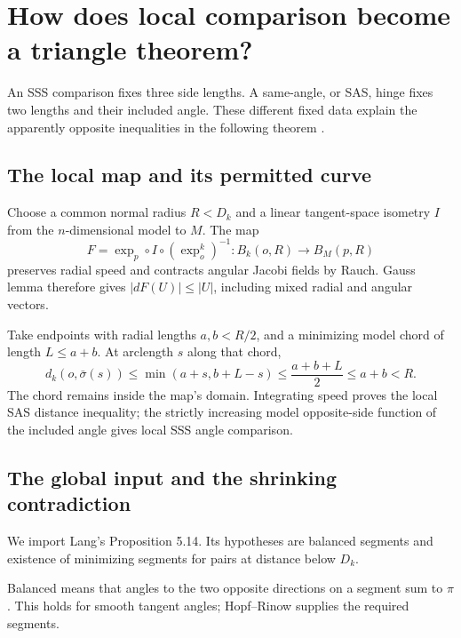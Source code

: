 \documentclass[12pt,reqno]{amsart}
\begin{document}
\section{How does local comparison become a triangle theorem?}
\label{sec:toponogov}

An SSS comparison fixes three side lengths. A same-angle, or SAS, hinge fixes two lengths and their included angle. These different fixed data explain the apparently opposite inequalities in the following theorem \cite{S-Lang-2026,S-Toponogov-1959}.

\begin{samepage}
\begin{theorem}[Toponogov]
\label{thm:toponogov}

\end{theorem}
\end{samepage}

\subsection*{The local map and its permitted curve}
Choose a common normal radius \(R<D_k\) and a linear tangent-space isometry \(I\) from the \(n\)-dimensional model to \(M\). The map
\[
F=\exp_p\circ I\circ(\exp_o^k)^{-1}:B_k(o,R)\longrightarrow B_M(p,R)
\]
preserves radial speed and contracts angular Jacobi fields by Rauch. Gauss lemma therefore gives \(|dF(U)|\le|U|\), including mixed radial and angular vectors.

Take endpoints with radial lengths \(a,b<R/2\), and a minimizing model chord of length \(L\le a+b\). At arclength \(s\) along that chord,
\[
d_k(o,\bar\sigma(s))\le\min(a+s,b+L-s)
\le\frac{a+b+L}{2}\le a+b<R.
\]
The chord remains inside the map's domain. Integrating speed proves the local SAS distance inequality; the strictly increasing model opposite-side function of the included angle gives local SSS angle comparison.

\subsection*{The global input and the shrinking contradiction}
We import Lang's Proposition 5.14. Its hypotheses are balanced segments and existence of minimizing segments for pairs at distance below \(D_k\).

Balanced means that angles to the two opposite directions on a segment sum to \(\pi\). This holds for smooth tangent angles; Hopf--Rinow supplies the required segments.
\end{document}
